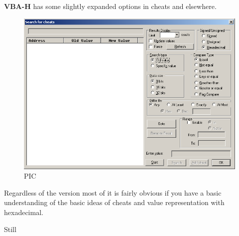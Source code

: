 \documentclass[
]{book}
\begin{document}
\textbf{VBA-H} has some slightly expanded options in cheats and elsewhere.

\begin{figure}
\centering
\includegraphics{images/195_home_fast6191_romhackingguide_unrenamed_fil___ginal_borders_romhackingguidegbavbahcheats1.png}
\caption{PIC}
\end{figure}

Regardless of the version most of it is fairly obvious if you have a basic understanding of the basic ideas of cheats and value representation with hexadecimal.

Still
\end{document}
